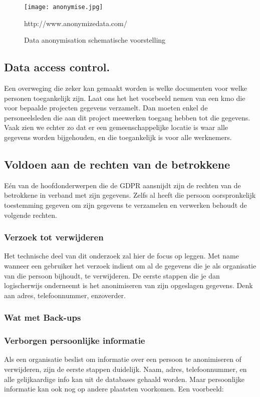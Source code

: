 \begin{figure}[h]
    \texttt{[image: anonymise.jpg]}
    \caption{Data anonymisation schematische voorstelling}
    http://www.anonymizedata.com/
\end{figure}


\subsection{Data access control.}
Een overweging die zeker kan gemaakt worden is welke documenten voor welke personen toegankelijk zijn. Laat ons het het voorbeeld nemen van een kmo die voor bepaalde projecten gegevens verzamelt. Dan moeten enkel de personeelsleden die aan dit project meewerken toegang hebben tot die gegevens.  Vaak zien we echter zo dat er een gemeenschappelijke locatie is waar alle gegevens worden bijgehouden, en die toegankelijk is voor alle werknemers. 

\subsection{Voldoen aan de rechten van de betrokkene}

Eén van de hoofdonderwerpen die de GDPR aansnijdt zijn de rechten van de betrokkene in verband met zijn gegevens. Zelfs al heeft die persoon oorspronkelijk toestemming gegeven om zijn gegevens te verzamelen en verwerken behoudt de volgende rechten.

\subsubsection{Verzoek tot verwijderen}
Het technische deel van dit onderzoek zal hier de focus op leggen. Met name wanneer een gebruiker het verzoek indient om al de gegevens die je als organisatie van die persoon bijhoudt, te verwijderen. De eerste stappen die je dan logischerwijs onderneemt is het anonimiseren van zijn opgeslagen gegevens. Denk aan adres, telefoonnummer, enzoverder. 

\subsubsection{Wat met Back-ups}

\subsubsection{Verborgen persoonlijke informatie}
Als een organisatie beslist om informatie over een persoon te anonimiseren of verwijderen, zijn de eerste stappen duidelijk. Naam, adres, telefoonnummer, en alle gelijkaardige info kan uit de databases gehaald worden. 
Maar persoonlijke informatie kan ook nog op andere plaatsten voorkomen. Een voorbeeld: 

